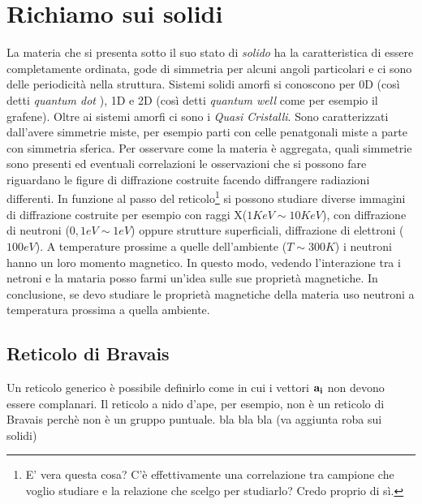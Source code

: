 \documentclass[a4paper,12pt]{article}
\begin{document}
\section{Richiamo sui solidi}
La materia che si presenta sotto il suo stato di \textit{solido} ha la caratteristica di essere completamente ordinata, gode di simmetria per alcuni angoli particolari e ci sono delle periodicità nella struttura. Sistemi solidi amorfi si conoscono per 0D (così detti \textit{quantum dot} ), 1D e 2D (così detti \textit{quantum well} come per esempio il grafene). Oltre ai sistemi amorfi ci sono i \textit{Quasi Cristalli}. Sono caratterizzati dall'avere simmetrie miste, per esempio parti con celle penatgonali miste a parte con simmetria sferica. Per osservare come la materia è aggregata, quali simmetrie sono presenti ed eventuali correlazioni le osservazioni che si possono fare riguardano le figure di diffrazione costruite facendo diffrangere radiazioni differenti. In funzione al passo del reticolo\footnote{E' vera questa cosa? C'è effettivamente una correlazione tra campione che voglio studiare e la relazione che scelgo per studiarlo? Credo proprio di sì.} si possono studiare diverse immagini di diffrazione costruite per esempio con raggi X($1 KeV \sim 10KeV$), con diffrazione di neutroni ($0,1 eV\sim 1 eV$) oppure strutture superficiali, diffrazione di elettroni ($100 eV$). A temperature prossime a quelle dell'ambiente ($T\sim 300K$) i neutroni hanno un loro momento magnetico. In questo modo, vedendo l'interazione tra i netroni e la mataria posso farmi un'idea sulle sue proprietà magnetiche. In conclusione, se devo studiare le proprietà magnetiche della materia uso neutroni a temperatura prossima a quella ambiente. 
\subsection{Reticolo di Bravais}
Un reticolo generico è possibile definirlo come 
in cui i vettori $\it\bf{a} _i$ non devono essere complanari. Il reticolo a nido d'ape, per esempio, non è un reticolo di Bravais perchè non è un gruppo puntuale.
bla bla bla (va aggiunta roba sui solidi)
\end{document}
